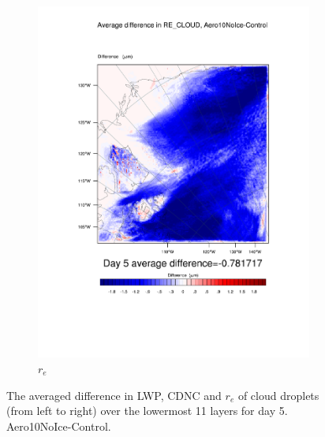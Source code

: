 \begin{figure}[hb]
	\begin{subfigure}{0.48\textwidth}
		\centering
		\includegraphics[width=\textwidth]{results/aero10ni/diff_Aero10NoIce_RE_CLOUD_Day5.pdf}
		\caption{$r_e$}
		\label{subfig:recloudr4Day5}
	\end{subfigure}
\caption{The averaged difference in LWP, CDNC and $r_e$ of cloud droplets (from left to right) over the lowermost 11 layers for day 5. Aero10NoIce-Control.}
\label{fig:lwpcdncre_r4Day5}
\end{figure}

